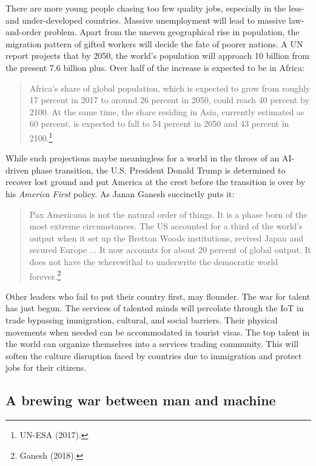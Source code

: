 \begin{multicols}{2}
There are more young people chasing too few quality jobs, especially in the less- and under-developed countries. Massive unemployment will lead to massive law-and-order problem. Apart from the uneven geographical rise in population, the migration pattern of gifted workers will decide the fate of poorer nations. A UN report projects that by 2050, the world's population will approach 10 billion from the present 7.6 billion plus. Over half of the increase is expected to be in Africa:

\begin{quote}
Africa's share of global population, which is expected to grow from roughly 17 percent in 2017 to around 26 percent in 2050, could reach 40 percent by 2100. At the same time, the share residing in Asia, currently estimated as 60 percent, is expected to fall to 54 percent in 2050 and 43 percent in 2100.\footnote{UN-ESA (2017).}
\end{quote}

While such projections maybe meaningless for a world in the throes of an AI-driven phase transition, the U.S. President Donald Trump is determined to recover lost ground and put America at the crest before the transition is over by his \textit{America First} policy. As Janan Ganesh succinctly puts it:

\begin{quote}
Pax Americana is not the natural order of things. It is a phase born of the most extreme
circumstances. The US accounted for a third of the world's output when it set up the Bretton Woods institutions, revived Japan and secured Europe ... It now accounts for about 20 percent of global output. It does not have the wherewithal to underwrite the democratic world forever.\footnote{Ganesh (2018).}
\end{quote}

Other leaders who fail to put their country first, may flounder. The war for talent has just begun. The services of talented minds will percolate through the IoT in trade bypassing immigration, cultural, and social barriers. Their physical movements when needed can be accommodated in tourist visas. The top talent in the world can organize themselves into a services trading community. This will soften the culture disruption faced by countries due to immigration and protect jobs for their citizens.

\subsection*{A brewing war between man and machine}


\end{multicols}
